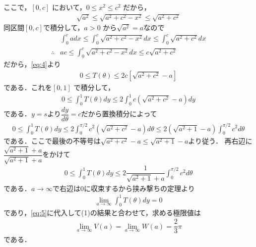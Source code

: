 \documentclass[../../main.tex]{subfiles}
\begin{document}
ここで，$[0,c]$ において，$0 \le x^2 \le c^2$ だから，
\begin{align}
  \sqrt{a^2} \le \sqrt{a^2+c^2-x^2} \le \sqrt{a^2+c^2}
\end{align}
同区間$[0,c]$で積分して，$a>0$ から$\sqrt{a^2}=a$なので
\begin{align}
  & \int_{0}^{c} a dx \le \int_{0}^{c} \sqrt{a^2+c^2-x^2} dx \le \int_{0}^{c} \sqrt{a^2+c^2} dx \\
  \therefore
  & ac \le \int_{0}^{c} \sqrt{a^2+c^2-x^2} dx \le c\sqrt{a^2+c^2}
\end{align}
だから，\cref{eq:4}より
\begin{align}
  0 \le T(\theta) \le 2c \left[ \sqrt{a^2+c^2} - a \right] \label{eq:6}
\end{align}
である．これを$[0,1]$ で積分して，
\begin{align}
  0 \le \int_{0}^{1} T(\theta) dy \le 2 \int_{0}^{1} c \left(\sqrt{a^2+c^2} - a \right) dy \label{eq:7}
\end{align}
である．$y=s$より$\dfrac{dy}{d\theta}=c$だから置換積分によって
\begin{align}
  0 \le \int_{0}^{1} T(\theta) dy \le 2 \int_{0}^{\pi/2} c^2\left( \sqrt{a^2+c^2} - a \right) d\theta \le 2(\sqrt{a^2+1} - a) \int_{0}^{\pi/2} c^2 d\theta
\end{align}
である．ここで最後の不等号は$\sqrt{a^2+c^2} - a \le \sqrt{a^2+1} -a$より従う．
再右辺に$\dfrac{\sqrt{a^2+1} + a}{\sqrt{a^2+1} + a}$をかけて
\begin{align}
  0 \le \int_{0}^{1} T(\theta) dy \le 2\dfrac{1}{\sqrt{a^2+1} + a} \int_{0}^{\pi/2} c^2 d\theta
\end{align}
である．$a\to\infty$で右辺は$0$に収束するから挟み撃ちの定理より
\begin{align}
  \lim_{a\to\infty} \int_{0}^{1} T(\theta) dy = 0
\end{align}
であり，\cref{eq:5}に代入して(1)の結果と合わせて，求める極限値は
\begin{align}
  \lim_{a\to\infty} V(a) = \lim_{a\to\infty} W(a) = \dfrac{2}{3}\pi
\end{align}
である．
\end{document}
